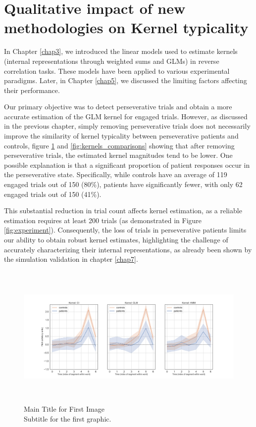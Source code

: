 \section{Qualitative impact of new methodologies on Kernel typicality}

In Chapter \ref{chap3}, we introduced the linear models used to estimate kernels (internal representations through weighted sums and GLMs) in reverse correlation tasks. These models have been applied to various experimental paradigms. Later, in Chapter \ref{chap5}, we discussed the limiting factors affecting their performance.

Our primary objective was to detect perseverative trials and obtain a more accurate estimation of the GLM kernel for engaged trials. However, as discussed in the previous chapter, simply removing perseverative trials does not necessarily improve the similarity of kernel typicality between perseverative patients and controls, figure \ref{fig:kernels_segments_methods} and \ref{fig:kernels_comparisons} showing that after removing perseverative trials, the estimated kernel magnitudes tend to be lower. One possible explanation is that a significant proportion of patient responses occur in the perseverative state. Specifically, while controls have an average of 119 engaged trials out of 150 (80\%), patients have significantly fewer, with only 62 engaged trials out of 150 (41\%).

This substantial reduction in trial count affects kernel estimation, as a reliable estimation requires at least 200 trials (as demonstrated in Figure \ref{fig:experiment}). Consequently, the loss of trials in perseverative patients limits our ability to obtain robust kernel estimates, highlighting the challenge of accurately characterizing their internal representations, as already been shown by the simulation validation in chapter \ref{chap7}.

\begin{figure}[H]
    \centering
    \includegraphics[width=17cm,height=7cm]{MainLayout/Images/chapter8/kernels_segments_methods.jpg}
    \caption{Main Title for First Image \\ \small Subtitle for the first graphic.}
    \label{fig:kernels_segments_methods}
\end{figure}


